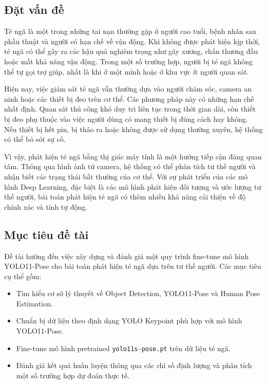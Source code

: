 \documentclass[12pt, a4paper]{article}
\begin{document}
\subsection{Đặt vấn đề}
Té ngã là một trong những tai nạn thường gặp ở người cao tuổi, bệnh nhân sau phẫu thuật và người có hạn chế về vận động.
Khi không được phát hiện kịp thời, té ngã có thể gây ra các hậu quả nghiêm trọng như gãy xương, chấn thương đầu hoặc mất khả năng vận động.
Trong một số trường hợp, người bị té ngã không thể tự gọi trợ giúp, nhất là khi ở một mình hoặc ở khu vực ít người quan sát.

Hiện nay, việc giám sát té ngã vẫn thường dựa vào người chăm sóc, camera an ninh hoặc các thiết bị đeo trên cơ thể.
Các phương pháp này có những hạn chế nhất định.
Quan sát thủ công khó duy trì liên tục trong thời gian dài, còn thiết bị đeo phụ thuộc vào việc người dùng có mang thiết bị đúng cách hay không.
Nếu thiết bị hết pin, bị tháo ra hoặc không được sử dụng thường xuyên, hệ thống có thể bỏ sót sự cố.

Vì vậy, phát hiện té ngã bằng thị giác máy tính là một hướng tiếp cận đáng quan tâm.
Thông qua hình ảnh từ camera, hệ thống có thể phân tích tư thế người và nhận biết các trạng thái bất thường của cơ thể.
Với sự phát triển của các mô hình Deep Learning, đặc biệt là các mô hình phát hiện đối tượng và ước lượng tư thế người, bài toán phát hiện té ngã có thêm nhiều khả năng cải thiện về độ chính xác và tính tự động.

\subsection{Mục tiêu đề tài}
Đề tài hướng đến việc xây dựng và đánh giá một quy trình fine-tune mô hình YOLO11-Pose cho bài toán phát hiện té ngã dựa trên tư thế người.
Các mục tiêu cụ thể gồm:
\begin{itemize}[nosep]
  \item Tìm hiểu cơ sở lý thuyết về Object Detection, YOLO11-Pose và Human Pose Estimation.
  \item Chuẩn bị dữ liệu theo định dạng YOLO Keypoint phù hợp với mô hình YOLO11-Pose.
  \item Fine-tune mô hình pretrained \texttt{yolo11s-pose.pt} trên dữ liệu té ngã.
  \item Đánh giá kết quả huấn luyện thông qua các chỉ số định lượng và phân tích một số trường hợp dự đoán thực tế.
\end{itemize}
\end{document}
